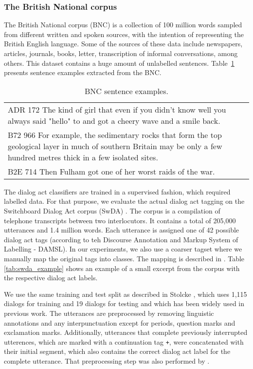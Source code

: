 \subsubsection*{The British National corpus}
The British National corpus (BNC) is a collection of 100 million words sampled from different written and spoken sources, with the intention of representing the British English language. Some of the sources of these data include newspapers, articles, journals, books, letter, transcription of informal conversations, among others. This dataset contains a huge amount of unlabelled sentences.
Table~\ref{tab:bnc_sent_example} presents sentence examples extracted from the BNC.

\begin{table}[h]
\centering
\begin{tabular}{p{}}
\hline
ADR 172 The kind of girl that even if you didn't know well you always said "hello" to and got a cheery wave and a smile back. \\
B72 966 For example, the sedimentary rocks that form the top geological layer in much of southern Britain may be only a few hundred metres thick in a few isolated sites. \\
B2E 714 Then Fulham got one of her worst raids of the war. \\
 \hline
\end{tabular}
\caption{BNC sentence examples.}
\label{tab:bnc_sent_example}
\end{table}


The dialog act classifiers are trained in a supervised fashion, which required labelled data.
For that purpose, we evaluate the actual dialog act tagging on the Switchboard Dialog Act corpus (SwDA) .
The corpus is a compilation of telephone transcripts between two interlocutors.
It contains a total of 205,000 utterances and 1.4 million words.
Each utterance is assigned one of 42 possible dialog act tags (according to teh Discourse Annotation and Markup System of Labelling - DAMSL).
In our experiments, we also use a coarser tagset where we manually map the original tags into  classes. The mapping is described in .
Table \ref{tab:swda_example} shows an example of a small excerpt from the corpus with the respective dialog act labels. 

We use the same training and test split as described in Stolcke , which uses 1,115 dialogs for training and 19 dialogs for testing and which has been widely used in previous work.
The utterances are preprocessed by removing linguistic annotations and any interpunctuation except for periods, question marks and exclamation marks.
Additionally, utterances that complete previously interrupted utterences, which are marked with a continuation tag \texttt{+}, were concatenated with their initial segment, which also contains the correct dialog act label for the complete utterance.
That preprocessing step was also performed by .

